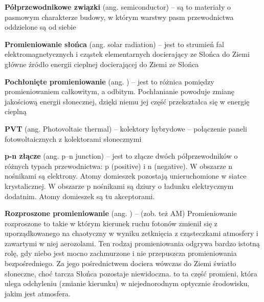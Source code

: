 \documentclass[12pt,a4paper]{article}
\begin{document}
\textbf{Półprzewodnikowe związki} (ang. semiconductor) – są to materiały o pasmowym charakterze budowy, w którym warstwy pasm przewodnictwa oddzielone są od siebie

\textbf{Promieniowanie słońca} (ang. solar radiation) – jest to strumień fal elektromagnetycznych i cząstek elementarnych docierający ze Słońca do Ziemi główne źródło energii cieplnej docierającej do Ziemi ze Słońca

\textbf{Pochłonięte promieniowanie} (ang. ) – jest to różnica pomiędzy promieniowaniem całkowitym, a odbitym. Pochłanianie powoduje zmianę jakościową energii słonecznej, dzięki niemu jej część przekształca się w energię cieplną


\textbf{PVT} (ang. Photovoltaic thermal) – kolektory hybrydowe – połączenie paneli fotowoltaicznych z kolektorami słonecznymi

\textbf{p-n złącze} (ang. p–n junction) – jest to złącze dwóch półprzewodników o różnych typach przewodnictwa: p (positive) i n (negative). W obszarze n nośnikami są elektrony. Atomy domieszek pozostają unieruchomione w siatce krystalicznej. W obszarze p nośnikami są dziury o ładunku elektrycznym dodatnim. Atomy domieszek są tu akceptorami.

\textbf{Rozproszone promieniowanie} (ang. ) –  (zob. też AM) Promieniowanie rozproszone to takie w którym kierunek ruchu fotonów zmienił się z uporządkowanego na chaotyczny w wyniku zetknięcia z cząsteczkami atmosfery i zawartymi w niej aerozolami. Ten rodzaj promieniowania odgrywa bardzo istotną rolę, gdy niebo jest mocno zachmurzone i nie przepuszcza promieniowania bezpośredniego. Za jego pośrednictwem dociera wówczas do Ziemi światło słoneczne, choć tarcza Słońca pozostaje niewidoczna. to ta część promieni, która ulega odchyleniu (zmianie kierunku) w niejednorodnym optycznie środowisku, jakim jest  atmosfera.
\end{document}
